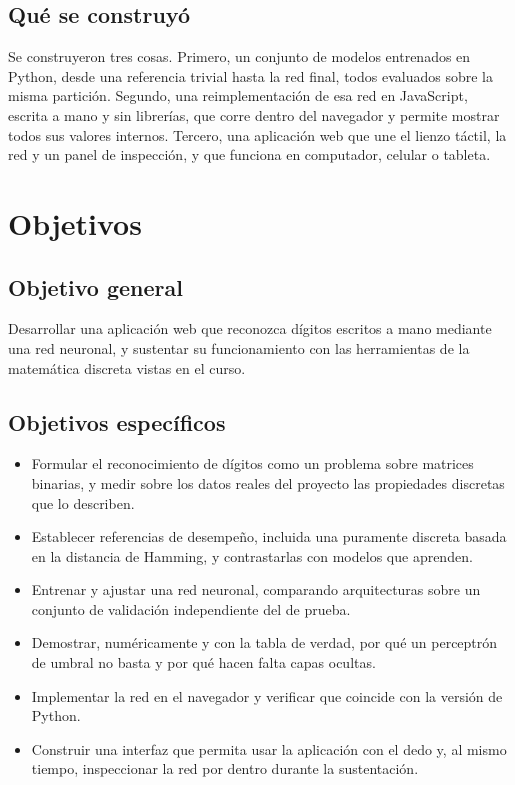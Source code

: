 \documentclass[12pt,letterpaper]{article}
\begin{document}
\subsection{Qué se construyó}

Se construyeron tres cosas. Primero, un conjunto de modelos entrenados en Python,
desde una referencia trivial hasta la red final, todos evaluados sobre la misma
partición. Segundo, una reimplementación de esa red en JavaScript, escrita a mano
y sin librerías, que corre dentro del navegador y permite mostrar todos sus
valores internos. Tercero, una aplicación web que une el lienzo táctil, la red y
un panel de inspección, y que funciona en computador, celular o tableta.

\section{Objetivos}

\subsection{Objetivo general}

Desarrollar una aplicación web que reconozca dígitos escritos a mano mediante una
red neuronal, y sustentar su funcionamiento con las herramientas de la matemática
discreta vistas en el curso.

\subsection{Objetivos específicos}

\begin{itemize}
\item Formular el reconocimiento de dígitos como un problema sobre matrices
  binarias, y medir sobre los datos reales del proyecto las propiedades discretas
  que lo describen.
\item Establecer referencias de desempeño, incluida una puramente discreta basada
  en la distancia de Hamming, y contrastarlas con modelos que aprenden.
\item Entrenar y ajustar una red neuronal, comparando arquitecturas sobre un
  conjunto de validación independiente del de prueba.
\item Demostrar, numéricamente y con la tabla de verdad, por qué un perceptrón de
  umbral no basta y por qué hacen falta capas ocultas.
\item Implementar la red en el navegador y verificar que coincide con la versión
  de Python.
\item Construir una interfaz que permita usar la aplicación con el dedo y, al
  mismo tiempo, inspeccionar la red por dentro durante la sustentación.
\end{itemize}
\end{document}
